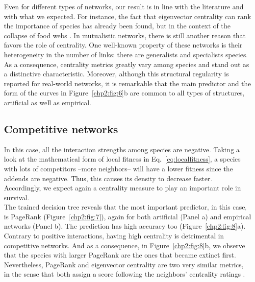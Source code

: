 Even for different types of networks, our result is in line with the literature and with what we expected. For instance, the fact that eigenvector centrality can rank the importance of species has already been found, but in the context of the collapse of food webs \cite{Allesina2009GooglingCoextinctions}. In mutualistic networks, there is still another reason that favors the role of centrality. One well-known property of these networks is their heterogeneity in the number of links: there are generalists and specialists species\cite{bascompte2003nested}. As a consequence, centrality metrics greatly vary among species and stand out as a distinctive characteristic. Moreover, although this structural regularity is reported for real-world networks, it is remarkable that the main predictor and the form of the curves in Figure~\ref{chp2:fig:6}b  are common to all types of structures, artificial as well as empirical. \\
 

\subsection{Competitive networks}
In this case, all the interaction strengths among species are negative. Taking a look at the mathematical form of local fitness in Eq.~\eqref{eq:localfitness}, a species with lots of competitors --more neighbors-- will have a lower fitness since the addends are negative. Thus, this causes its density to decrease faster. Accordingly, we expect again a centrality measure to play an important role in survival. \\

The trained decision tree reveals that the most important predictor, in this case, is  PageRank (Figure~\ref{chp2:fig:7}), again for both artificial (Panel a) and empirical networks (Panel b). The prediction has high accuracy too (Figure~\ref{chp2:fig:8}a).\\

Contrary to positive interactions, having high centrality is detrimental in competitive networks. And as a consequence, in Figure~\ref{chp2:fig:8}b, we observe that the species with  larger PageRank are the ones that became extinct first. Nevertheless, PageRank and eigenvector centrality are two very similar metrics, in the sense that both assign a score following the neighbors' centrality ratings \cite{Newman2010}. \\
 
